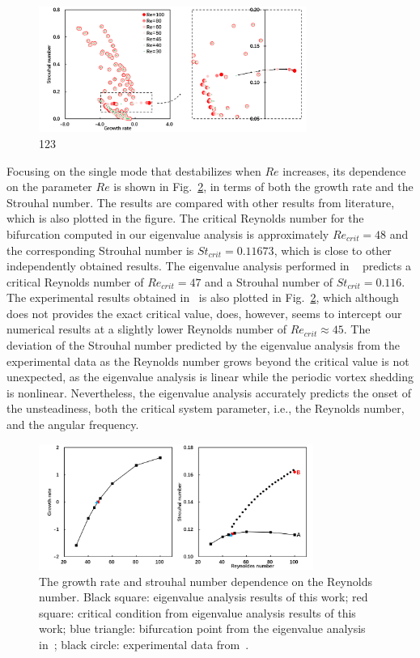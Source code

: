 \documentclass[journal,final]{new-aiaa}
\begin{document}
\begin{figure}[htb]
	\centering   
	\includegraphics[width=0.78\textwidth]{cylinder-eigenvalue.png}
	\caption{123}
	\label{fig:cyl-eigen}
\end{figure}

Focusing on the single mode that destabilizes when $Re$ increases, its
dependence on the parameter $Re$ is shown in Fig.~\ref{fig:cyl-stab},
in terms of both the growth rate and the Strouhal number. The results
are compared with other results from literature, which is also plotted
in the figure. The critical Reynolds number for the bifurcation computed
in our eigenvalue analysis is approximately $Re_{crit}=48$ and the corresponding
Strouhal number is $St_{crit}=0.11673$, which is close to other independently
obtained results. The eigenvalue analysis performed in ~\cite{Crouch2007Predicting} predicts a critical Reynolds number of $Re_{crit}=47$ and a Strouhal number of
$St_{crit}=0.116$. The experimental results obtained in~\cite{C1989Oblique}
is also plotted in Fig.~\ref{fig:cyl-stab}, which although does not
provides the exact critical value, does, however, seems to intercept our
numerical results at a slightly lower Reynolds number of $Re_{crit} \approx 45$.
The deviation of the Strouhal number predicted by the eigenvalue analysis
from the experimental data as the Reynolds number grows beyond the critical
value is not unexpected, as the eigenvalue analysis is linear while the
periodic vortex shedding is nonlinear. Nevertheless, the eigenvalue analysis
accurately predicts the onset of the unsteadiness, both the critical system
parameter, i.e., the Reynolds number, and the angular frequency.

	\begin{figure}[htb]
	\centering   
	\includegraphics[width=0.8\textwidth]{cylinder-stab.png}
	\caption{The growth rate and strouhal number dependence on the
	Reynolds number. Black square: eigenvalue analysis results of
	this work; red square: critical condition from eigenvalue
	analysis results of this work; blue triangle: bifurcation
	point from the eigenvalue analysis in~\cite{Crouch2007Predicting};
	black circle: experimental data from~\cite{C1989Oblique}.}
	\label{fig:cyl-stab}
	\end{figure}
\end{document}
